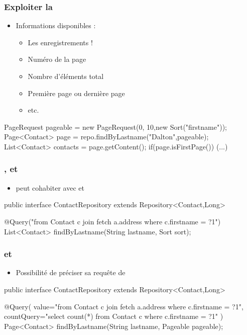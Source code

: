 \begin{frame}[fragile]
 \frametitle{Exploiter la }
 \begin{itemize}
  \item Informations disponibles :
  \begin{itemize}
   \item Les enregistrements !
   \item Numéro de la page
   \item Nombre d'éléments total
   \item Première page ou dernière page
   \item etc.
  \end{itemize}
 \end{itemize}
 \begin{javacode}
PageRequest pageable = new PageRequest(0, 10,new Sort("firstname"));
Page<Contact> page = repo.findByLastname("Dalton",pageable);
List<Contact> contacts = page.getContent();
if(page.isFirstPage()) { (...) }
 \end{javacode}
\end{frame}

\begin{frame}[fragile]
 \frametitle{,  et }
 \begin{itemize}
  \item {} peut cohabiter avec  et 
 \end{itemize}
 \begin{javacode}
public interface ContactRepository extends Repository<Contact,Long> {

  @Query("from Contact c join fetch a.address where c.firstname = ?1")
  List<Contact> findByLastname(String lastname, Sort sort);
  
}
 \end{javacode}
\end{frame}

\begin{frame}[fragile]
 \frametitle{ et }
 \begin{itemize}
  \item Possibilité de préciser sa requête de 
 \end{itemize}
 \begin{javacode}
public interface ContactRepository extends Repository<Contact,Long> {

  @Query(
    value="from Contact c join fetch a.address where c.firstname = ?1",
    countQuery="select count(*) from Contact c where c.firstname = ?1"
  )
  Page<Contact> findByLastname(String lastname, Pageable pageable);
  
}
 \end{javacode}
\end{frame}